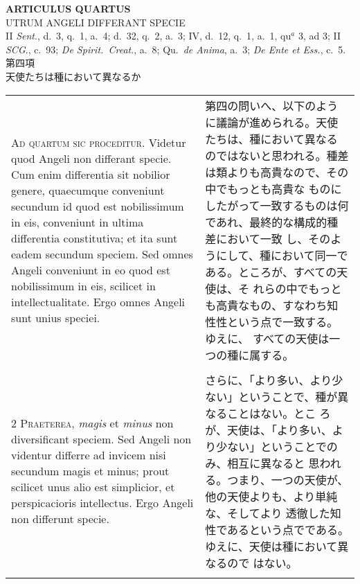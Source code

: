 \documentclass[10pt]{jsarticle} %
\begin{document}
\newpage

\begin{center}
 {\Large {\bf ARTICULUS QUARTUS}}\\
 {\large UTRUM ANGELI DIFFERANT SPECIE}\\
 {\footnotesize II {\itshape Sent}., d.~3, q.~1, a.~4; d.~32, q.~2,
 a.~3; IV, d.~12, q.~1, a.~1, qu$^a$ 3, ad 3; II {\itshape SCG}., c.~93;
 {\itshape De Spirit.~Creat}., a.~8; Qu.~{\itshape de Anima}, a.~3;
 {\itshape De Ente et Ess.}, c.~5.}\\
 {\Large 第四項\\天使たちは種において異なるか}
\end{center}

\begin{longtable}{p{21em}p{21em}}
{\huge A}{\scshape d quartum sic proceditur}. Videtur quod
Angeli non differant specie. Cum enim differentia sit nobilior genere,
quaecumque conveniunt secundum id quod est nobilissimum in eis,
conveniunt in ultima differentia constitutiva; et ita sunt eadem
secundum speciem. Sed omnes Angeli conveniunt in eo quod est
nobilissimum in eis, scilicet in intellectualitate. Ergo omnes Angeli
sunt unius speciei.


&

第四の問いへ、以下のように議論が進められる。天使たちは、種において異なる
 のではないと思われる。種差は類よりも高貴なので、その中でもっとも高貴な
 ものにしたがって一致するものは何であれ、最終的な構成的種差において一致
 し、そのようにして、種において同一である。ところが、すべての天使は、そ
 れらの中でもっとも高貴なもの、すなわち知性性という点で一致する。ゆえに、
 すべての天使は一つの種に属する。


\\\\


{\scshape 2 Praeterea}, {\itshape magis} et {\itshape minus} non diversificant
speciem. Sed Angeli non videntur differre ad invicem nisi secundum magis
et minus; prout scilicet unus alio est simplicior, et perspicacioris
intellectus. Ergo Angeli non differunt specie.


&
さらに、「より多い、より少ない」ということで、種が異なることはない。とこ
 ろが、天使は、「より多い、より少ない」ということでのみ、相互に異なると
 思われる。つまり、一つの天使が、他の天使よりも、より単純な、そしてより
 透徹した知性であるという点でである。ゆえに、天使は種において異なるので
 はない。

\\\\


\end{longtable}
\end{document}
